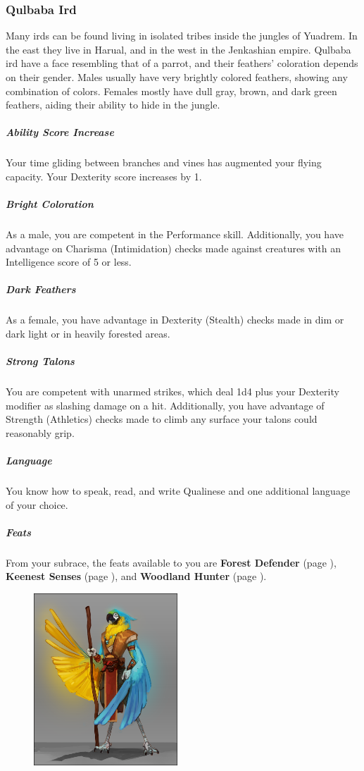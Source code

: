 \subsubsection{Qulbaba Ird}
    Many irds can be found living in isolated tribes inside the jungles of Yuadrem.
    In the east they live in Harual, and in the west in the Jenkashian empire.
    Qulbaba ird have a face resembling that of a parrot, and their feathers' coloration depends on their gender.
    Males usually have very brightly colored feathers, showing any combination of colors.
    Females mostly have dull gray, brown, and dark green feathers, aiding their ability to hide in the jungle.

    \subparagraph{Ability Score Increase} Your time gliding between branches and vines has augmented your flying capacity.
    Your Dexterity score increases by 1.

    \subparagraph{Bright Coloration} As a male, you are competent in the Performance skill.
    Additionally, you have advantage on Charisma (Intimidation) checks made against creatures with an Intelligence score of 5 or less.

    \subparagraph{Dark Feathers} As a female, you have advantage in Dexterity (Stealth) checks made in dim or dark light or in heavily forested areas.

    \subparagraph{Strong Talons} You are competent with unarmed strikes, which deal 1d4 plus your Dexterity modifier as slashing damage on a hit.
    Additionally, you have advantage of Strength (Athletics) checks made to climb any surface your talons could reasonably grip.

    \subparagraph{Language} You know how to speak, read, and write Qualinese and one additional language of your choice.

    \subparagraph{Feats} From your subrace, the feats available to you are
    \textbf{Forest Defender} (page \pageref{feat::forestdefender}),
    \textbf{Keenest Senses} (page \pageref{feat::keenestsenses}), and
    \textbf{Woodland Hunter} (page \pageref{feat::woodlandhunter}).

\begin{figure}[!b]
    \centering
    \includegraphics[width=0.48\textwidth]{04kins/img/12ird_qulbaba.png}
\end{figure}

